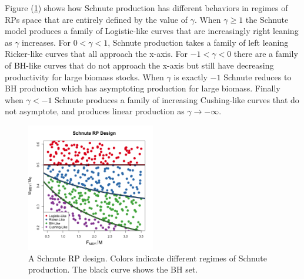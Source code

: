 %
Figure (\ref{colorDes}) shows how Schnute production has different behaviors in regimes 
of RPs space that are entirely defined by the value of $\gamma$. %
When $\gamma\ge1$ the Schnute model produces a family of Logistic-like curves that are
increasingly right leaning as $\gamma$ increases.
For $0<\gamma<1$, Schnute production takes a family of left leaning Ricker-like curves
that all approach the x-axis. For $-1<\gamma<0$ there are a family of BH-like
curves that do not approach the x-axis but still have decreasing productivity for large
biomass stocks. When $\gamma$ is exactly $-1$ Schnute reduces to BH production which has
asymptoting production for large biomass. Finally when $\gamma<-1$ Schnute
produces a family of increasing Cushing-like curves that do not asymptote, and produces
linear production as $\gamma\to-\infty$.

%
\begin{figure}
\vspace{-0.5cm}
\includegraphics[width=0.5\textwidth]{../ddBias/designLineColorHHardFlatT30N150WWideN112.png}
\vspace{-1cm}
\caption{
A Schnute RP design. %
Colors indicate different regimes of Schnute production. %
The black curve shows the BH set.
}
\label{colorDes}
\end{figure}

